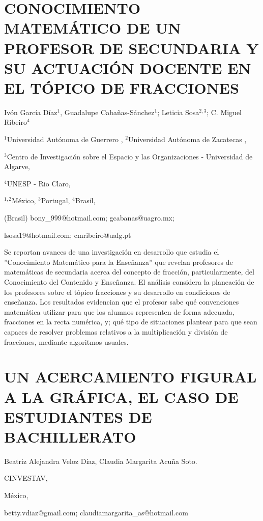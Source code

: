 \section{CONOCIMIENTO MATEMÁTICO DE UN PROFESOR DE SECUNDARIA Y SU ACTUACIÓN
DOCENTE EN EL TÓPICO DE FRACCIONES}

\begin{datos}

Ivón García Díaz$^{1}$, Guadalupe Cabañas-Sánchez$^{1}$; Leticia
Sosa$^{2,3}$; C. Miguel Ribeiro$^{4}$

$^{1}$Universidad Autónoma de Guerrero , $^{2}$Universidad Autónoma
de Zacatecas ,

$^{3}$Centro de Investigación sobre el Espacio y las Organizaciones
- Universidad de Algarve,

$^{4}$UNESP - Rio Claro,

$^{1,2}$México, $^{3}$Portugal, $^{4}$Brasil,

(Brasil) bony\_999@hotmail.com; gcabanas@uagro.mx; 

lsosa19@hotmail.com; cmribeiro@ualg.pt

\end{datos}

Se reportan avances de una investigación en desarrollo que estudia
el ”Conocimiento Matemático para la Enseñanza” que revelan profesores
de matemáticas de secundaria acerca del concepto de fracción, particularmente,
del Conocimiento del Contenido y Enseñanza. El análisis considera
la planeación de los profesores sobre el tópico fracciones y su desarrollo
en condiciones de enseñanza. Los resultados evidencian que el profesor
sabe qué convenciones matemática utilizar para que los alumnos representen
de forma adecuada, fracciones en la recta numérica, y; qué tipo de
situaciones plantear para que sean capaces de resolver problemas relativos
a la multiplicación y división de fracciones, mediante algoritmos
usuales.


\section{UN ACERCAMIENTO FIGURAL A LA GRÁFICA, EL CASO DE ESTUDIANTES DE BACHILLERATO}

\begin{datos}

Beatriz Alejandra Veloz Díaz, Claudia Margarita Acuña Soto.

CINVESTAV,

México,

betty.vdiaz@gmail.com; claudiamargarita\_as@hotmail.com 

\end{datos}

